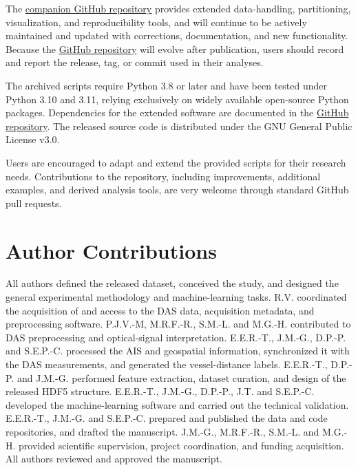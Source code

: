 \documentclass[11pt]{article}
\begin{document}
The \href{https://github.com/UAH-PSI/das-vessel-detection}{companion GitHub repository} provides extended data-handling, partitioning, visualization, and reproducibility tools, and will continue to be actively maintained and updated with corrections, documentation, and new functionality. Because the \href{https://github.com/UAH-PSI/das-vessel-detection}{GitHub repository} will evolve after publication, users should record and report the release, tag, or commit used in their analyses.

The archived scripts require Python 3.8 or later and have been tested under Python 3.10 and 3.11, relying exclusively on widely available open-source Python packages. Dependencies for the extended software are documented in the \href{https://github.com/UAH-PSI/das-vessel-detection}{GitHub repository}. The released source code is distributed under the GNU General Public License v3.0.

Users are encouraged to adapt and extend the provided scripts for their research needs. Contributions to the repository, including improvements, additional examples, and derived analysis tools, are very welcome through standard GitHub pull requests.





% 


\section*{Author Contributions}

All authors defined the released dataset, conceived the study, and designed the general experimental methodology and machine-learning tasks. R.V. coordinated the acquisition of and access to the DAS data, acquisition metadata, and preprocessing software. P.J.V.-M, M.R.F.-R., S.M.-L. and M.G.-H. contributed to DAS preprocessing and optical-signal interpretation. E.E.R.-T., J.M.-G., D.P.-P. and S.E.P.-C. processed the AIS and geospatial information, synchronized it with the DAS measurements, and generated the vessel-distance labels. E.E.R.-T., D.P.-P. and J.M.-G. performed feature extraction, dataset curation, and design of the released HDF5 structure. E.E.R.-T., J.M.-G., D.P.-P., J.T. and S.E.P.-C. developed the machine-learning software and carried out the technical validation. E.E.R.-T., J.M.-G. and S.E.P.-C. prepared and published the data and code repositories, and drafted the manuscript. J.M.-G., M.R.F.-R., S.M.-L. and M.G.-H. provided scientific supervision, project coordination, and funding acquisition. All authors reviewed and approved the manuscript.
\end{document}
